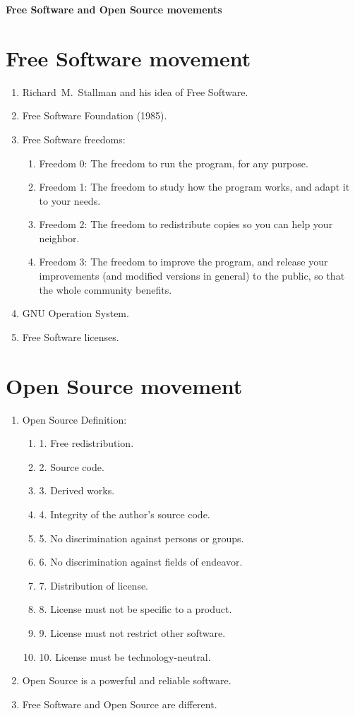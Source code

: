 \documentclass[10pt,a4paper]{proc}
\newcommand{\bee}{\begin{enumerate}\setlength{\itemsep}{-0.7mm}}
\newcommand{\ene}{\end{enumerate}}
\begin{document}
\pagestyle{empty}
\pagestyle{fancy}
\rhead{\today}
\cfoot{}

\begin{center}
{\LARGE \bfseries Free Software and Open Source movements}
\end{center}

\section{Free Software movement}

\bee
  \item Richard~M.~Stallman and his idea of Free Software.
  \item Free Software Foundation (1985).
  \item Free Software freedoms:
  \bee
    \item[Freedom 0:] The freedom to run the program, for any purpose.
    \item[Freedom 1:] The freedom to study how the program works, and adapt it to 
your needs.
    \item[Freedom 2:] The freedom to redistribute copies so you can help your 
neighbor.
    \item[Freedom 3:] The freedom to improve the program, and release your 
improvements (and modified versions in general) to the public, so that the 
whole community benefits.
  \end{enumerate}
  \item GNU Operation System.
  \item Free Software licenses.
\ene

\section{Open Source movement}
\bee
  \item Open Source Definition:
  \bee
    \item[1.] Free redistribution.
    \item[2.] Source code.
    \item[3.] Derived works.
    \item[4.] Integrity of the author's source code.
    \item[5.] No discrimination against persons or groups.
    \item[6.] No discrimination against fields of endeavor.
    \item[7.] Distribution of license.
    \item[8.] License must not be specific to a product.
    \item[9.] License must not restrict other software.
    \item[10.] License must be technology-neutral.
  \ene
  \item Open Source is a powerful and reliable software.
  \item Free Software and Open Source are different.
\ene
\end{document}
